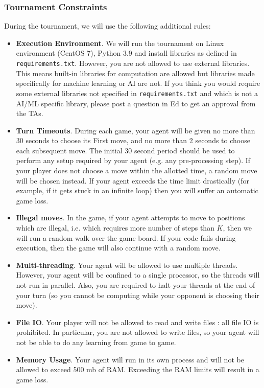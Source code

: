 \documentclass[twoside,11pt]{article}
\begin{document}
\subsubsection{Tournament Constraints}
\label{sec:tournament_constraints}

During the tournament, we will use the following additional rules:

\begin{itemize}
    \item \textbf{Execution Environment}. We will run the tournament on Linux environment (CentOS 7), Python 3.9 and install libraries as defined in \texttt{requirements.txt}. However, you are not allowed to use external libraries. This means built-in libraries for computation are allowed but libraries made specifically for machine learning or AI are not. If you think you would require some external libraries not specified in \texttt{requirements.txt} and which is not a AI/ML specific library, please post a question in Ed to get an approval from the TAs.

    \item \textbf{Turn Timeouts}. During each game, your agent will be given no more than 30 seconds to choose its First move, and no more than 2 seconds to choose each subsequent move. The initial 30 second period should be used to perform any setup required by your agent (e.g. any pre-processing step). If your player does not choose a move within the allotted time, a random move will be chosen instead. If your agent exceeds the time limit drastically (for example, if it gets stuck in an infinite loop) then you will suffer an automatic game loss.
    
    \item \textbf{Illegal moves}. In the game, if your agent attempts to move to positions which are illegal, i.e. which requires more number of steps than $K$, then we will run a random walk over the game board. If your code fails during execution, then the game will also continue with a random move.
    
    \item \textbf{Multi-threading}. Your agent will be allowed to use multiple threads. However, your agent will be confined to a single processor, so the threads will not run in parallel. Also, you are required to halt your threads at the end of your turn (so you cannot be computing while your opponent is choosing their move).
    
    \item \textbf{File IO}. Your player will not be allowed to read and write files : all file IO is prohibited. In particular, you are not allowed to write files, so your agent will not be able to do any learning from game to game.
    
    \item \textbf{Memory Usage}. Your agent will run in its own process and will not be allowed to exceed 500 mb of RAM.  Exceeding the RAM limits will result in a game loss. 
    
\end{itemize}
\end{document}
